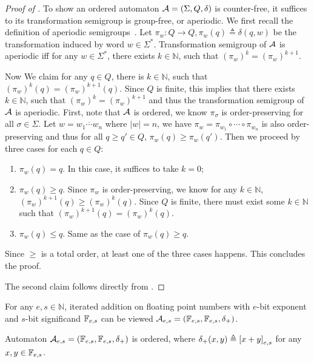 \begin{proof}[Proof of ]
	To show an ordered automaton ${\mathcal{A}} = (\Sigma,Q,\delta)$ is counter-free, it suffices to its transformation semigroup is group-free, or aperiodic. We first recall the definition of aperiodic semigroups~. Let $\pi_w:Q\to Q, \pi_w(q)\triangleq\delta(q,w)$ be the transformation induced by word $w\in\Sigma^*$. Transformation semigroup of ${\mathcal{A}}$ is aperiodic iff for any $w\in\Sigma^*$, there exists $k\in\mathbb{N}$, such that $(\pi_w)^k = (\pi_w)^{k+1}$. 
		
	
	Now  We claim for any $q\in Q$, there is $k\in\mathbb{N}$, such that $(\pi_w)^k(q) = (\pi_w)^{k+1}(q)$. Since $Q$ is finite, this implies that there exists $k\in\mathbb{N}$, such that $(\pi_w)^k = (\pi_w)^{k+1}$ and thus the transformation semigroup of ${\mathcal{A}}$ is aperiodic. First, note that ${\mathcal{A}}$ is ordered, we know $\pi_\sigma$ is order-preserving for all $\sigma\in \Sigma$. Let $w = \overline{w_1\cdots w_n}$ where $|w|=n$, we have $\pi_w = \pi_{w_1}\circ \cdots \circ \pi_{w_n}$ is also order-preserving and thus for all $q\ge q'\in Q$, $\pi_w(q)\ge \pi_w(q')$. Then we proceed by three cases for each $q\in Q$: 
	\begin{enumerate}
		\item $ \pi_w(q)=q$. In this case, it suffices to take $k=0$;
		\item $\pi_w(q)\ge q$. Since $\pi_w$ is order-preserving, we know for any $k\in \mathbb{N}$, $(\pi_w)^{k+1}(q)\ge (\pi_w)^{k}(q)$. Since $Q$ is finite, there must exist some $k\in \mathbb{N}$ such that $(\pi_w)^{k+1}(q)= (\pi_w)^{k}(q)$.
		\item $\pi_w(q)\le q$. Same as the case of $\pi_w(q)\ge q$.
	\end{enumerate}

	Since $\ge$ is a total order, at least one of the three cases happens. This concludes the proof.
	
	The second claim follows directly from .
\end{proof}

For any $e,s\in\mathbb{N}$, iterated addition on floating point numbers with $e$-bit exponent and $s$-bit significand $\mathbb{F}_{e,s}$ can be viewed ${\mathcal{A}}_{e,s} = (\mathbb{F}_{e,s},\mathbb{F}_{e,s}, \delta_{+})$.
\begin{theorem}\label{thm:floating_point_is_ordered_automaton}
Automaton ${\mathcal{A}}_{e,s} = (\mathbb{F}_{e,s},\mathbb{F}_{e,s}, \delta_{+})$ is ordered, where $\delta_+(x,y) \triangleq \left[x+y\right]_{e,s}$ for any $x,y\in\mathbb{F}_{e,s}$.
\end{theorem}


